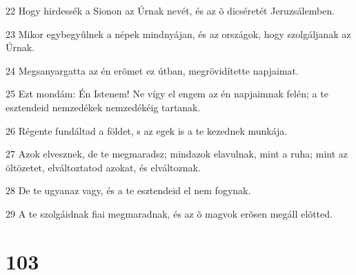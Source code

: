 \par 22 Hogy hirdessék a Sionon az Úrnak nevét, és az õ dicséretét Jeruzsálemben.
\par 23 Mikor egybegyûlnek a népek mindnyájan, és az országok, hogy szolgáljanak az Úrnak.
\par 24 Megsanyargatta az én erõmet ez útban, megrövidítette napjaimat.
\par 25 Ezt mondám: Én Istenem! Ne vígy el engem az én napjaimnak felén; a te esztendeid nemzedékek nemzedékéig tartanak.
\par 26 Régente fundáltad a földet, s az egek is a te kezednek munkája.
\par 27 Azok elvesznek, de te megmaradsz; mindazok elavulnak, mint a ruha; mint az öltözetet, elváltoztatod azokat, és elváltoznak.
\par 28 De te ugyanaz vagy, és a te esztendeid el nem fogynak.
\par 29 A te szolgáidnak fiai megmaradnak, és az õ magvok erõsen megáll elõtted.

\chapter{103}


